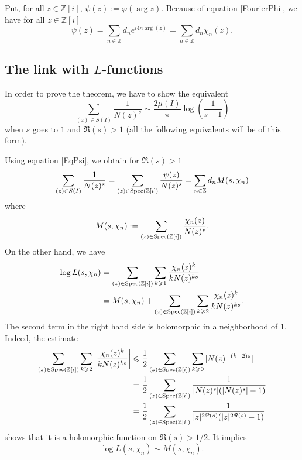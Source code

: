 \documentclass[12pt,a4paper,english]{article}
\theoremstyle{plain}
\theoremstyle{definition}
\DeclareMathOperator{\Spec}{\normalfont{Spec}}
\begin{document}
Put, for all $z\in\mathbb{Z}[i]$, $\psi(z):=\varphi(\arg z)$. Because of equation \eqref{FourierPhi}, we have for all $z\in\mathbb{Z}[i]$
\begin{equation}\label{EqPsi}
    \psi(z)=\sum_{n\in\mathbb{Z}}d_n e^{i4n \arg(z)}=\sum_{n\in\mathbb{Z}}d_n \chi_n(z).
\end{equation}

\subsection*{The link with $L$-functions}

In order to prove the theorem, we have to show the equivalent
\begin{equation}\label{goal}
    \sum_{(z)\in S(I)}\frac{1}{N(z)^s}\sim \frac{2\mu(I)}{\pi}\log\left(\frac{1}{s-1}\right)
\end{equation}
when $s$ goes to $1$ and $\Re(s)>1$ (all the following equivalents will be of this form).

Using equation \eqref{EqPsi}, we obtain for $\Re(s)>1$
\begin{equation}\label{eqM}
    \sum_{(z)\in S(I)}\frac{1}{N(z)^s}=\sum_{(z)\in \Spec(\mathbb{Z}[i])}\frac{\psi(z)}{N(z)^s}=\sum_{n\in\mathbb{Z}}d_n M(s,\chi_n)
\end{equation}
where
\begin{equation*}
    M(s,\chi_n):=\sum_{(z)\in \Spec(\mathbb{Z}[i])}\frac{\chi_n(z)}{N(z)^s}.
\end{equation*}
On the other hand, we have
\begin{align*}
    \log L(s,\chi_n)&=\sum_{(z)\in \Spec(\mathbb{Z}[i])}\sum_{k\geqslant 1}\frac{\chi_n(z)^k}{kN(z)^{ks}}\\
    &=M(s,\chi_n)+\sum_{(z)\in \Spec(\mathbb{Z}[i])}\sum_{k\geqslant 2}\frac{\chi_n(z)^k}{kN(z)^{ks}}.
\end{align*}
The second term in the right hand side is holomorphic in a neighborhood of $1$. Indeed, the estimate
\begin{align*}
    \sum_{(z)\in \Spec(\mathbb{Z}[i])}\sum_{k\geqslant 2}\left|\frac{\chi_n(z)^k}{kN(z)^{ks}}\right|&\leqslant\frac{1}{2}\sum_{(z)\in \Spec(\mathbb{Z}[i])}\sum_{k\geqslant 0}|N(z)^{-(k+2)s}|\\
    &=\frac{1}{2}\sum_{(z)\in \Spec(\mathbb{Z}[i])}\frac{1}{|N(z)^s|(|N(z)^s|-1)}\\
    &=\frac{1}{2}\sum_{(z)\in \Spec(\mathbb{Z}[i])}\frac{1}{|z|^{2\Re(s)}(|z|^{2\Re(s)}-1)}
\end{align*}
shows that it is a holomorphic function on $\Re(s)>1/2$. It implies
\begin{equation}\label{fctnLM}
    \log L(s,\chi_n)\sim M(s,\chi_n).
\end{equation}
\end{document}
